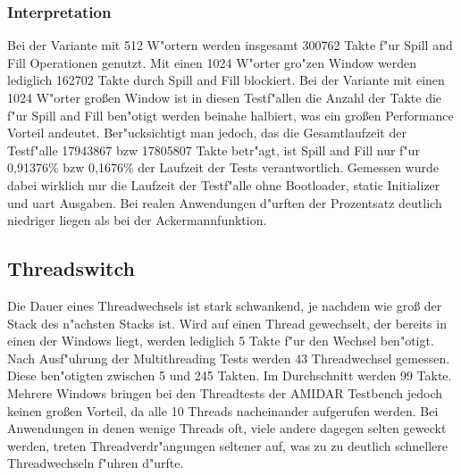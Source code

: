 \subsubsection{Interpretation}
Bei der Variante mit 512 W"ortern werden insgesamt 300762 Takte f"ur Spill and Fill Operationen genutzt. Mit einen 1024 W"orter gro"zen Window werden lediglich 162702 Takte durch Spill and Fill blockiert. Bei der Variante mit einen 1024 W"orter großen Window ist in diesen Testf"allen die Anzahl der Takte die f"ur Spill and Fill ben"otigt werden beinahe halbiert, was ein großen Performance Vorteil andeutet. Ber"ucksichtigt man jedoch, das die Gesamtlaufzeit der Testf"alle 17943867 bzw 17805807 Takte betr"agt, ist Spill and Fill nur f"ur 0,91376\% bzw 0,1676\% der Laufzeit der Tests verantwortlich. Gemessen wurde dabei wirklich nur die Laufzeit der Testf"alle ohne Bootloader, static Initializer und uart Ausgaben. Bei realen Anwendungen d"urften der Prozentsatz deutlich niedriger liegen als bei der Ackermannfunktion. 


\subsection{Threadswitch}
Die Dauer eines Threadwechsels ist stark schwankend, je nachdem wie groß der Stack des n"achsten Stacks ist. Wird auf einen Thread gewechselt, der bereits in einen der Windows liegt, werden lediglich 5 Takte f"ur den Wechsel ben"otigt. Nach Ausf"uhrung der Multithreading Tests werden 43 Threadwechsel gemessen. Diese ben"otigten zwischen 5 und 245 Takten. Im Durchschnitt werden 99 Takte. Mehrere Windows bringen bei den Threadtests der AMIDAR Testbench jedoch keinen großen Vorteil, da alle 10 Threads nacheinander aufgerufen werden. Bei Anwendungen in denen wenige Threads oft, viele andere dagegen selten geweckt werden, treten Threadverdr"angungen seltener auf, was zu zu deutlich schnellere Threadwechseln f"uhren d"urfte. 

